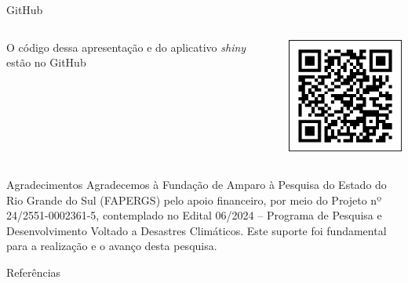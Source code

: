 \documentclass[aspectratio=1610]{beamer}
\begin{document}
\begin{frame}{\Huge{GitHub}}
    \begin{columns}
        \begin{column}{0.4\textwidth}
            \Large{
                O código dessa apresentação e do aplicativo \textit{shiny} estão no GitHub
            }
            \newline
            \newline
        \end{column}
        \begin{column}{0.5\textwidth}
            \includegraphics[width=\textwidth]{qr_code.png}
        \end{column}
    \end{columns}
\end{frame}

\begin{frame}{Agradecimentos}
    \Large{Agradecemos à Fundação de Amparo à Pesquisa do Estado do Rio Grande do Sul (FAPERGS) pelo apoio financeiro, por meio do Projeto nº 24/2551-0002361-5, contemplado no Edital 06/2024 – Programa de Pesquisa e Desenvolvimento Voltado a Desastres Climáticos. Este suporte foi fundamental para a realização e o avanço desta pesquisa.}
\end{frame}

\begin{frame}[allowframebreaks]{Referências}
    \nocite{*}
    \printbibliography[heading=none]
\end{frame}

\end{document}
